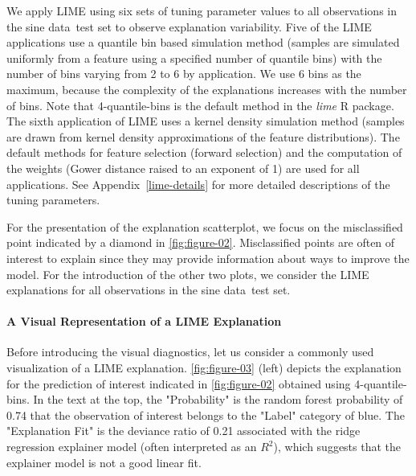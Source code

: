 \documentclass[AMS,STIX2COL]{WileyNJD-v2}\usepackage[]{graphicx}\usepackage[]{color}
\newcommand{\data}{sine data}
\begin{document}
We apply LIME using six sets of tuning parameter values to all observations in the \data \ test set to observe explanation variability. Five of the LIME applications use a  quantile bin based simulation method (samples are simulated uniformly from a feature using a specified number of quantile bins) with the number of bins varying from 2 to 6 by application. We use 6 bins as the maximum, because the complexity of the explanations increases with the number of bins. Note that 4-quantile-bins is  the default method in the \emph{lime} R package. The sixth application of LIME uses a kernel density simulation method (samples are drawn from kernel density approximations of the feature distributions). The default methods for feature selection (forward selection) and the computation of the weights (Gower distance raised to an exponent of 1) are used for all applications. See Appendix~\ref{lime-details} for more detailed descriptions of the tuning parameters.

For the presentation of the explanation scatterplot, we focus on the misclassified point indicated by a diamond in \autoref{fig:figure-02}. Misclassified points are often of interest to explain since they may provide information about ways to improve the model. For the introduction of the other two plots, we consider the LIME explanations for all observations in the \data \ test set.

\paragraph{A Visual Representation of a LIME Explanation}

Before introducing the visual diagnostics, let us consider a commonly used visualization of a LIME explanation. \autoref{fig:figure-03} (left) depicts the explanation for the prediction of interest indicated in \autoref{fig:figure-02} obtained using 4-quantile-bins. In the text at the top, the "Probability" is the random forest probability of 0.74 that the observation of interest belongs to the "Label" category of blue. The "Explanation Fit" is the deviance ratio of 0.21 associated with the ridge regression explainer model (often interpreted as an $R^2$), which suggests that the explainer model is not a good linear fit.
\end{document}

